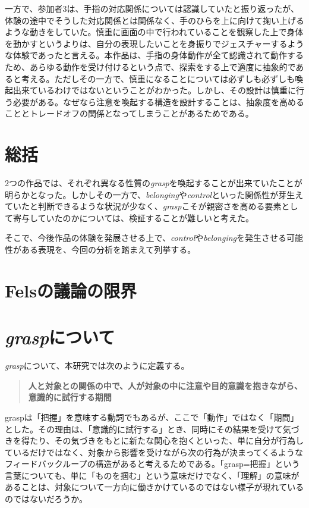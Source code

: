 一方で、参加者3は、手指の対応関係については認識していたと振り返ったが、体験の途中でそうした対応関係とは関係なく、手のひらを上に向けて掬い上げるような動きをしていた。慎重に画面の中で行われていることを観察した上で身体を動かすというよりは、自分の表現したいことを身振りでジェスチャーするような体験であったと言える。本作品は、手指の身体動作が全て認識されて動作するため、あらゆる動作を受け付けるという点で、探索をする上で適度に抽象的であると考える。ただしその一方で、慎重になることについては必ずしも必ずしも喚起出来ているわけではないということがわかった。しかし、その設計は慎重に行う必要がある。なぜなら注意を喚起する構造を設計することは、抽象度を高めることとトレードオフの関係となってしまうことがあるためである。

\section{総括}
2つの作品では、それぞれ異なる性質の\textit{grasp}を喚起することが出来ていたことが明らかとなった。しかしその一方で、\textit{belonging}や\textit{control}といった関係性が芽生えていたと判断できるような状況が少なく、\textit{grasp}こそが親密さを高める要素として寄与していたのかについては、検証することが難しいと考えた。

そこで、今後作品の体験を発展させる上で、\textit{control}や\textit{belonging}を発生させる可能性がある表現を、今回の分析を踏まえて列挙する。

\section{Felsの議論の限界}

\section{\textit{grasp}について}
\textit{grasp}について、本研究では次のように定義する。

\begin{quote}
  \textbf{人と対象との関係の中で、人が対象の中に注意や目的意識を抱きながら、意識的に試行する期間}
\end{quote}

graspは「把握」を意味する動詞でもあるが、ここで「動作」ではなく「期間」とした。その理由は、「意識的に試行する」とき、同時にその結果を受けて気づきを得たり、その気づきをもとに新たな関心を抱くといった、単に自分が行為しているだけではなく、対象から影響を受けながら次の行為が決まってくるようなフィードバックループの構造があると考えるためである。「grasp=把握」という言葉についても、単に「ものを掴む」という意味だけでなく、「理解」の意味があることは、対象について一方向に働きかけているのではない様子が現れているのではないだろうか。

